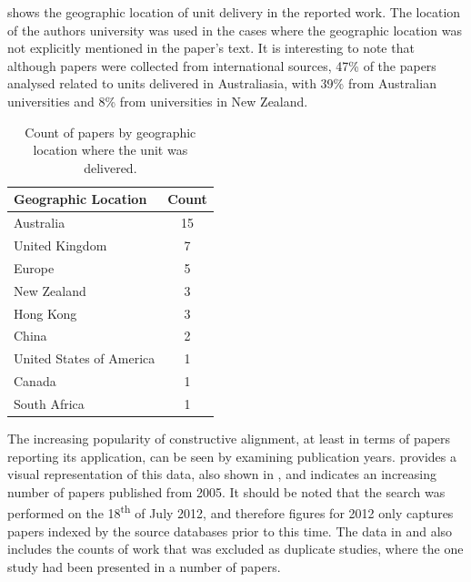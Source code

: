  shows the geographic location of unit delivery in the reported work. The location of the authors university was used in the cases where the geographic location was not explicitly mentioned in the paper's text. It is interesting to note that although papers were collected from international sources, 47\% of the papers analysed related to units delivered in Australiasia, with 39\% from Australian universities and 8\% from universities in New Zealand. 

\begin{table}[htbp]
	\centering
	\caption{Count of papers by geographic location where the unit was delivered.}
	\label{tbl:location}
	\footnotesize
    \begin{tabular}{lc}
    \textbf{Geographic Location} & \textbf{Count} \\ \hline
		Australia	 & 15 \\
		United Kingdom & 	7 \\
		Europe & 	5 \\
		New Zealand & 	3 \\
		Hong Kong & 	3 \\
		China & 	2 \\
		United States of America & 	1 \\
		Canada & 	1 \\
		South Africa & 	1 \\
    \end{tabular}
\end{table}

The increasing popularity of constructive alignment, at least in terms of papers reporting its application, can be seen by examining publication years.  provides a visual representation of this data, also shown in , and indicates an increasing number of papers published from 2005. It should be noted that the search was performed on the 18\textsuperscript{th} of July 2012, and therefore figures for 2012 only captures papers indexed by the source databases prior to this time. The data in  and  also includes the counts of work that was excluded as duplicate studies, where the one study had been presented in a number of papers.

